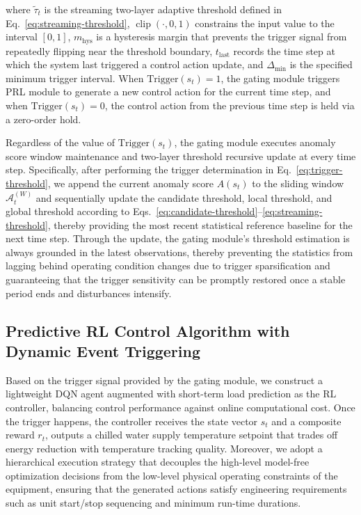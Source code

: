 ﻿\documentclass[preprint,12pt,number]{elsarticle}
\begin{document}
\noindent where \(\tilde{\tau}_t\) is the streaming two-layer adaptive threshold defined in Eq.~\eqref{eq:streaming-threshold}, \(\operatorname{clip}(\cdot, 0, 1)\) constrains the input value to the interval \([0,1]\), \(m_{\mathrm{hys}}\) is a hysteresis margin that prevents the trigger signal from repeatedly flipping near the threshold boundary, \(t_{\mathrm{last}}\) records the time step at which the system last triggered a control action update, and \(\Delta_{\min}\) is the specified minimum trigger interval. When \(\mathrm{Trigger}(s_t)=1\), the gating module triggers PRL module to generate a new control action for the current time step, and when \(\mathrm{Trigger}(s_t)=0\), the control action from the previous time step is held via a zero-order hold.

Regardless of the value of \(\mathrm{Trigger}(s_t)\), the gating module executes anomaly score window maintenance and two-layer threshold recursive update at every time step. Specifically, after performing the trigger determination in Eq.~\eqref{eq:trigger-threshold}, we append the current anomaly score \(A(s_t)\) to the sliding window \(\mathcal{A}_t^{(W)}\) and sequentially update the candidate threshold, local threshold, and global threshold according to Eqs.~\eqref{eq:candidate-threshold}--\eqref{eq:streaming-threshold}, thereby providing the most recent statistical reference baseline for the next time step. Through the update, the gating module's threshold estimation is always grounded in the latest observations, thereby preventing the statistics from lagging behind operating condition changes due to trigger sparsification and guaranteeing that the trigger sensitivity can be promptly restored once a stable period ends and disturbances intensify.

\subsection{Predictive RL Control Algorithm with Dynamic Event Triggering}\label{predictive-rl-control-algorithm-with-dynamic-event-triggering}

Based on the trigger signal provided by the gating module, we construct a lightweight DQN agent augmented with short-term load prediction as the RL controller, balancing control performance against online computational cost. Once the trigger happens, the controller receives the state vector \(s_t\) and a composite reward \(r_t\), outputs a chilled water supply temperature setpoint that trades off energy reduction with temperature tracking quality. Moreover, we adopt a hierarchical execution strategy that decouples the high-level model-free optimization decisions from the low-level physical operating constraints of the equipment, ensuring that the generated actions satisfy engineering requirements such as unit start/stop sequencing and minimum run-time durations.
\end{document}
